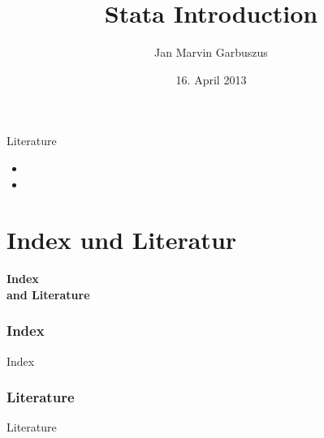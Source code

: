 \documentclass[hyperref={bookmarks=true}, aspectratio=43]{beamer}
\author[Garbuszus]{Jan Marvin Garbuszus}
\title{Stata Introduction}
\date{16. April 2013}
\institute{}
\begin{document}
\begin{frame}
  \maketitle
\end{frame}

\begin{frame}{Literature}
\begin{minipage}{11cm}

\begin{itemize}
\item {}
\item {}
\end{itemize}

\end{minipage}
\end{frame}








\part{Index und Literatur}
\begin{frame}
\thispagestyle{empty}
\textbf{\huge{Index \\ and Literature}}
\end{frame}

\section{Index}
\begin{frame}{Index}
\setlength{\columnseprule}{.4pt} 
\begin{multicols}{5}
 \begin{miniscule}
\printindex
 \end{miniscule}
\end{multicols}
\end{frame}

\section{Literature}
\begin{frame}[allowframebreaks]{Literature}
 \printbibliography[title=none]
\end{frame}
\end{document}
